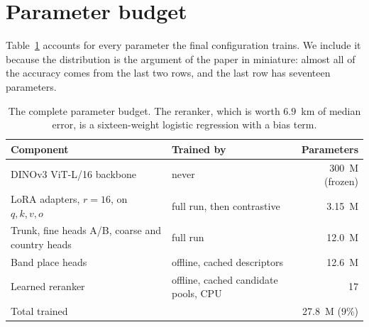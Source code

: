 \documentclass[11pt,a4paper]{article}
\begin{document}
\section{Parameter budget}

Table~\ref{tab:params} accounts for every parameter the final configuration trains. We include it
because the distribution is the argument of the paper in miniature: almost all of the accuracy
comes from the last two rows, and the last row has seventeen parameters.

\begin{table}[t]
\centering
\footnotesize
\begin{tabular}{llr}
\toprule
Component & Trained by & Parameters \\
\midrule
DINOv3 ViT-L/16 backbone & never & 300~M (frozen) \\
LoRA adapters, $r{=}16$, on $q,k,v,o$ & full run, then contrastive & 3.15~M \\
Trunk, fine heads A/B, coarse and country heads & full run & 12.0~M \\
Band place heads & offline, cached descriptors & 12.6~M \\
Learned reranker & offline, cached candidate pools, CPU & 17 \\
\midrule
Total trained & & 27.8~M ($9\%$) \\
\bottomrule
\end{tabular}
\caption{The complete parameter budget. The reranker, which is worth $6.9$~km of median error,
is a sixteen-weight logistic regression with a bias term.}
\label{tab:params}
\end{table}
\end{document}
